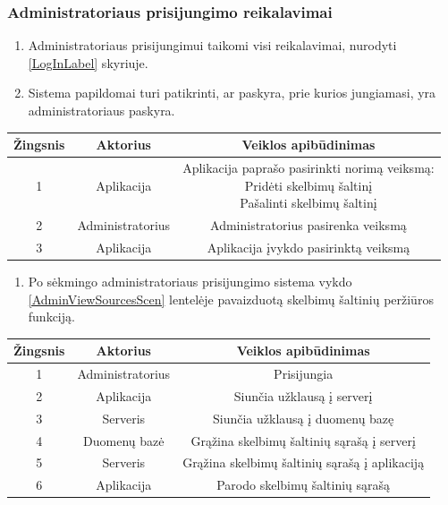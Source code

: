 \documentclass[12pt]{article}
\begin{document}
	\subsubsection{Administratoriaus prisijungimo reikalavimai}
	\begin{enumerate}[labelindent=10pt,leftmargin=2.2cm]
		\item Administratoriaus prisijungimui taikomi visi reikalavimai, nurodyti \ref{LogInLabel} skyriuje.
		\item Sistema papildomai turi patikrinti, ar paskyra, prie kurios jungiamasi, yra administratoriaus paskyra.
	\end{enumerate}
		
		\begin{center}
		\begin{tabular}{ | c | c | c | }
			\hline
			Žingsnis & Aktorius         & Veiklos apibūdinimas \\ \hline
			1        & Aplikacija       & \makecell{Aplikacija paprašo pasirinkti norimą veiksmą: \\ Pridėti skelbimų šaltinį \\ Pašalinti skelbimų šaltinį} \\ \hline
			2        & Administratorius & Administratorius pasirenka veiksmą \\ \hline
			3        & Aplikacija       & Aplikacija įvykdo pasirinktą veiksmą \\ \hline
		\end{tabular}
		\end{center}
		\bigskip
		
	\begin{enumerate}[resume,labelindent=10pt,leftmargin=2.2cm]
		\item Po sėkmingo administratoriaus prisijungimo sistema vykdo \ref{AdminViewSourcesScen} lentelėje pavaizduotą skelbimų šaltinių peržiūros funkciją.
	\end{enumerate}

		\begin{center}
		\begin{tabular}{ | c | c | c | }
			\hline
			Žingsnis & Aktorius         & Veiklos apibūdinimas \\ \hline
			1        & Administratorius & Prisijungia \\ \hline
			2        & Aplikacija       & Siunčia užklausą į serverį \\ \hline
			3        & Serveris         & Siunčia užklausą į duomenų bazę \\ \hline
			4        & Duomenų bazė     & Grąžina skelbimų šaltinių sąrašą į serverį \\ \hline
			5        & Serveris         & Grąžina skelbimų šaltinių sąrašą į aplikaciją \\ \hline
			6        & Aplikacija       & Parodo skelbimų šaltinių sąrašą \\ \hline
		\end{tabular}
		\end{center}
		\pagebreak
	
\end{document}
